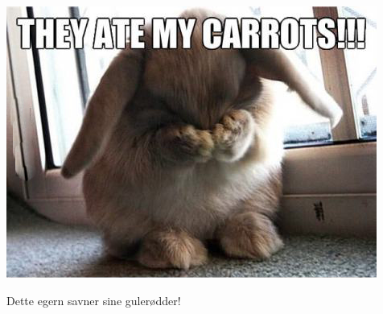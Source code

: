 \begin{minipage}[t]{120mm}
\includegraphics[width=\linewidth]{egern.jpg}
\caption{Dette egern savner sine gulerødder!}
\end{minipage}
